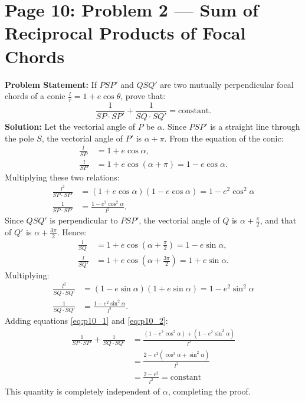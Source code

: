 \section{Page 10: Problem 2 --- Sum of Reciprocal Products of Focal Chords}
\label{sec:page10}

\begin{examplebox}
\textbf{Problem Statement:}
If $PSP'$ and $QSQ'$ are two mutually perpendicular focal chords of a conic $\frac{l}{r} = 1 + e\cos\theta$, prove that:
\begin{equation*}
    \frac{1}{SP \cdot SP'} + \frac{1}{SQ \cdot SQ'} = \text{constant}.
\end{equation*}
\tcblower
\textbf{Solution:}
Let the vectorial angle of $P$ be $\alpha$. Since $PSP'$ is a straight line through the pole $S$, the vectorial angle of $P'$ is $\alpha + \pi$.
From the equation of the conic:
\begin{align}
    \frac{l}{SP} &= 1 + e\cos\alpha, \\
    \frac{l}{SP'} &= 1 + e\cos(\alpha + \pi) = 1 - e\cos\alpha.
\end{align}
Multiplying these two relations:
\begin{align}
    \frac{l^2}{SP \cdot SP'} &= (1 + e\cos\alpha)(1 - e\cos\alpha) = 1 - e^2\cos^2\alpha \nonumber\\
    \frac{1}{SP \cdot SP'} &= \frac{1 - e^2\cos^2\alpha}{l^2}. \label{eq:p10_1}
\end{align}
Since $QSQ'$ is perpendicular to $PSP'$, the vectorial angle of $Q$ is $\alpha + \frac{\pi}{2}$, and that of $Q'$ is $\alpha + \frac{3\pi}{2}$.
Hence:
\begin{align}
    \frac{l}{SQ} &= 1 + e\cos\left(\alpha + \frac{\pi}{2}\right) = 1 - e\sin\alpha, \\
    \frac{l}{SQ'} &= 1 + e\cos\left(\alpha + \frac{3\pi}{2}\right) = 1 + e\sin\alpha.
\end{align}
Multiplying:
\begin{align}
    \frac{l^2}{SQ \cdot SQ'} &= (1 - e\sin\alpha)(1 + e\sin\alpha) = 1 - e^2\sin^2\alpha \nonumber\\
    \frac{1}{SQ \cdot SQ'} &= \frac{1 - e^2\sin^2\alpha}{l^2}. \label{eq:p10_2}
\end{align}
Adding equations \eqref{eq:p10_1} and \eqref{eq:p10_2}:
\begin{align}
    \frac{1}{SP \cdot SP'} + \frac{1}{SQ \cdot SQ'} &= \frac{(1 - e^2\cos^2\alpha) + (1 - e^2\sin^2\alpha)}{l^2} \nonumber\\
    &= \frac{2 - e^2(\cos^2\alpha + \sin^2\alpha)}{l^2} \nonumber\\
    &= \boxed{\frac{2 - e^2}{l^2} = \text{constant}}
\end{align}
This quantity is completely independent of $\alpha$, completing the proof.
\end{examplebox}

